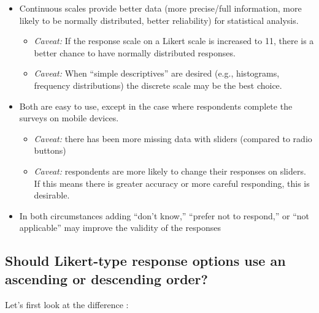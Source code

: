 \documentclass[
  english,
]{book}
\providecommand{\tightlist}{%
  \setlength{\itemsep}{0pt}\setlength{\parskip}{0pt}}
\begin{document}
\begin{itemize}
\tightlist
\item
  Continuous scales provide better data (more precise/full information, more likely to be normally distributed, better reliability) for statistical analysis.

  \begin{itemize}
  \tightlist
  \item
    \emph{Caveat:} If the response scale on a Likert scale is increased to 11, there is a better chance to have normally distributed responses.
  \item
    \emph{Caveat:} When ``simple descriptives'' are desired (e.g., histograms, frequency distributions) the discrete scale may be the best choice.
  \end{itemize}
\item
  Both are easy to use, except in the case where respondents complete the surveys on mobile devices.

  \begin{itemize}
  \tightlist
  \item
    \emph{Caveat:} there has been more missing data with sliders (compared to radio buttons)
  \item
    \emph{Caveat:} respondents are more likely to change their responses on sliders. If this means there is greater accuracy or more careful responding, this is desirable.
  \end{itemize}
\item
  In both circumstances adding ``don't know,'' ``prefer not to respond,'' or ``not applicable'' may improve the validity of the responses
\end{itemize}

\hypertarget{should-likert-type-response-options-use-an-ascending-or-descending-order}{%
\subsection{Should Likert-type response options use an ascending or descending order?}\label{should-likert-type-response-options-use-an-ascending-or-descending-order}}

Let's first look at the difference \citep{chyung_evidence-based_2018}:
\end{document}
